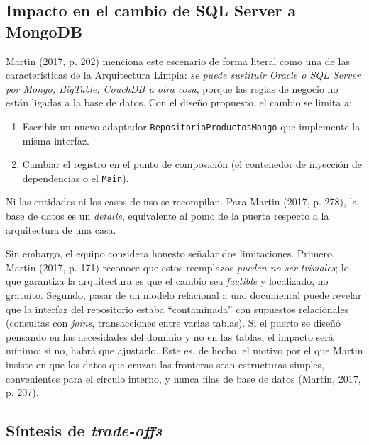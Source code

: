 \documentclass[11pt,a4paper]{article}
\begin{document}
\subsection{Impacto en el cambio de SQL Server a MongoDB}

Martin (2017, p. 202) menciona este escenario de forma literal como una de las características de la Arquitectura Limpia: \emph{se puede sustituir Oracle o SQL Server por Mongo, BigTable, CouchDB u otra cosa}, porque las reglas de negocio no están ligadas a la base de datos. Con el diseño propuesto, el cambio se limita a:

\begin{enumerate}[leftmargin=1.5em]
  \item Escribir un nuevo adaptador \texttt{RepositorioProductosMongo} que implemente la misma interfaz.
  \item Cambiar el registro en el punto de composición (el contenedor de inyección de dependencias o el \texttt{Main}).
\end{enumerate}

Ni las entidades ni los casos de uso se recompilan. Para Martin (2017, p. 278), la base de datos es un \emph{detalle}, equivalente al pomo de la puerta respecto a la arquitectura de una casa.

Sin embargo, el equipo considera honesto señalar dos limitaciones. Primero, Martin (2017, p. 171) reconoce que estos reemplazos \emph{pueden no ser triviales}; lo que garantiza la arquitectura es que el cambio sea \emph{factible} y localizado, no gratuito. Segundo, pasar de un modelo relacional a uno documental puede revelar que la interfaz del repositorio estaba ``contaminada'' con supuestos relacionales (consultas con \emph{joins}, transacciones entre varias tablas). Si el puerto se diseñó pensando en las necesidades del dominio y no en las tablas, el impacto será mínimo; si no, habrá que ajustarlo. Este es, de hecho, el motivo por el que Martin insiste en que los datos que cruzan las fronteras sean estructuras simples, convenientes para el círculo interno, y nunca filas de base de datos (Martin, 2017, p. 207).

\subsection{Síntesis de \emph{trade-offs}}
\end{document}
